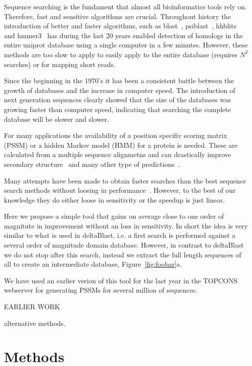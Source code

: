 \documentclass{bioinfo}
\begin{document}
Sequence searching is the fundament that almost all bioinformatics
tools rely on. Therefore, fast and sensitive algorithms are
crucial. Throughout history the introduction of better and faster
algorithms, such as blast~\cite{}, psiblast~\cite{Altschul},
hhblits~\cite{soding} and hmmer3~\cite{eddy} has during the last 20
years enabled detection of homologs in the entire uniprot database
using a single computer in a few minutes. However, these methods are
too slow to apply to easily apply to the entire database (requires
$N^2$ searches) or for mapping short reads.

Since the beginning in the 1970's it has been a consistent battle
between the growth of databases and the increase in computer
speed. The introduction of next generation sequences clearly showed
that the size of the databases was growing faster than computer speed,
indicating that searching the complete database will be slower and
slower. 

For many applications the availability of a position specifiv scoring
matrix (PSSM) or a hidden Markov model (HMM) for a protein is
needed. These are calculated from a multiple sequence alignmetns and
can drastically improve secondary structure~\cite{phd} and many other type of
predictions~\cite{TOPCONS}.


Many attempts have been made to obtain faster searches than the best
sequence search methods without loosing in
performance~\cite{hhblits,deltablast,berger}. However, to the best of
our knowledge they do either loose in sensitivity or the speedup is
just linear. 

Here we propose a simple tool that gains on average close to one order
of magnitute in improvement without an loss in sensitivity. In short
the idea is very similar to what is used in deltaBlast, i.e. a first
search is performed against a several order of magnitude domain
database. However, in contrast to deltaBlast we do not stop after this
search, instead we extract the full length sequences of all to create
an intermediate database, Figure~\ref{fig:foobar}a.

We have used an earlier verion of this tool for the last year in the
TOPCONS webserver for generating PSSMs for several million of
sequences.


EARLIER WORK 

alternative methods.


\section{Methods}
\end{document}
